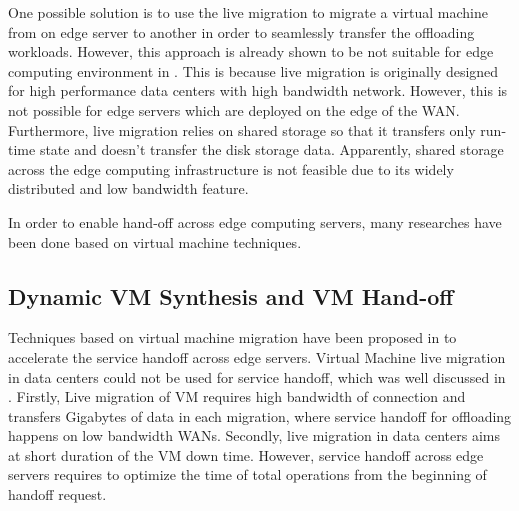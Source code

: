 One possible solution is to use the live migration\cite{vmlivemig} to migrate a virtual machine from on edge server to another in order to seamlessly transfer the offloading workloads. However, this approach is already shown to be not suitable for edge computing environment in  \cite{ha2015vmhandoff}. This is because live migration is originally designed for high performance data centers with high bandwidth network. However, this is not possible for edge servers which are deployed on the edge of the WAN. Furthermore, live migration relies on shared storage so that it transfers only run-time state and doesn't transfer the disk storage data. Apparently, shared storage across the edge computing infrastructure is not feasible due to its widely distributed and low bandwidth feature. 

In order to enable hand-off across edge computing servers, many researches have been done based on virtual machine techniques. 


\subsection{Dynamic VM Synthesis and VM Hand-off} \label{motivation:vmhandoff}

Techniques based on virtual machine migration have been proposed in  \cite{ha2015vmhandoff} \cite{satya2009case} to accelerate the service handoff across edge servers. Virtual Machine live migration in data centers could not be used for service handoff, which was well discussed in \cite{ha2015vmhandoff}. Firstly, Live migration of VM requires high bandwidth of connection and transfers Gigabytes of data in each migration, where service handoff for offloading happens on low bandwidth WANs. Secondly, live migration in data centers aims at short duration of the VM down time. However, service handoff across edge servers requires to optimize the time of total operations from the beginning of handoff request. 

